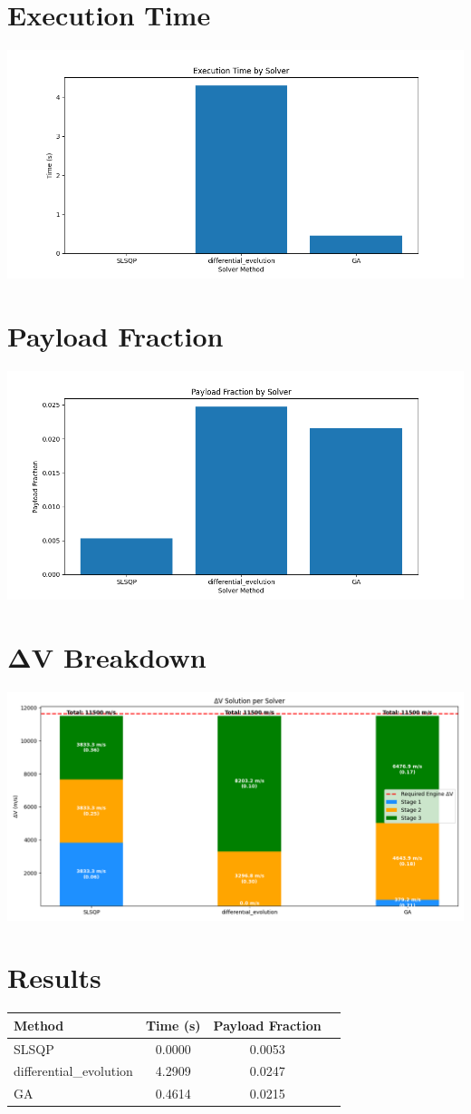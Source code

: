 \documentclass{article}
\begin{document}
\section{Execution Time}
\includegraphics[width=\textwidth]{execution_time.png}

\section{Payload Fraction}
\includegraphics[width=\textwidth]{payload_fraction.png}
                
\section{ΔV Breakdown}
\includegraphics[width=\textwidth]{dv_breakdown.png}

\section{Results}
\begin{tabular}{lccc}
\hline
Method & Time (s) & Payload Fraction \\
\hline
SLSQP & 0.0000 & 0.0053 \\
differential_evolution & 4.2909 & 0.0247 \\
GA & 0.4614 & 0.0215 \\
\hline
\end{tabular}
\end{document}
